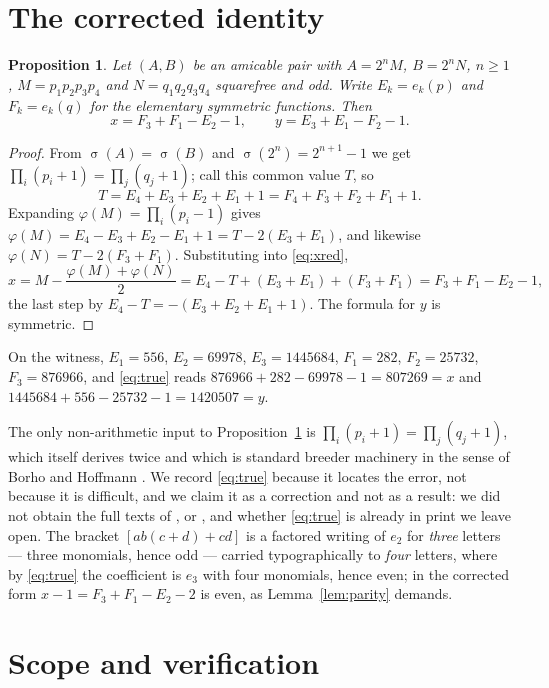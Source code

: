 \documentclass[11pt]{amsart}
\newtheorem{proposition}[theorem]{Proposition}
\theoremstyle{remark}
\DeclareMathOperator{\sig}{\sigma}
\begin{document}
\section{The corrected identity}

\begin{proposition}\label{prop:true}
Let $(A,B)$ be an amicable pair with $A=2^nM$, $B=2^nN$, $n\ge1$,
$M=p_1p_2p_3p_4$ and $N=q_1q_2q_3q_4$ squarefree and odd. Write $E_k=e_k(p)$
and $F_k=e_k(q)$ for the elementary symmetric functions. Then
\begin{equation}\label{eq:true}
 x=F_3+F_1-E_2-1,
 \qquad
 y=E_3+E_1-F_2-1 .
\end{equation}
\end{proposition}

\begin{proof}
From $\sig(A)=\sig(B)$ and $\sig(2^n)=2^{n+1}-1$ we get
$\prod_i(p_i+1)=\prod_j(q_j+1)$; call this common value $T$, so
\[
 T=E_4+E_3+E_2+E_1+1=F_4+F_3+F_2+F_1+1 .
\]
Expanding $\varphi(M)=\prod_i(p_i-1)$ gives
$\varphi(M)=E_4-E_3+E_2-E_1+1=T-2(E_3+E_1)$, and likewise
$\varphi(N)=T-2(F_3+F_1)$. Substituting into \eqref{eq:xred},
\[
 x=M-\frac{\varphi(M)+\varphi(N)}{2}
  =E_4-T+(E_3+E_1)+(F_3+F_1)
  =F_3+F_1-E_2-1 ,
\]
the last step by $E_4-T=-(E_3+E_2+E_1+1)$. The formula for $y$ is symmetric.
\end{proof}

On the witness, $E_1=556$, $E_2=69978$, $E_3=1445684$, $F_1=282$, $F_2=25732$,
$F_3=876966$, and \eqref{eq:true} reads $876966+282-69978-1=807269=x$ and
$1445684+556-25732-1=1420507=y$.

The only non-arithmetic input to Proposition~\ref{prop:true} is
$\prod_i(p_i+1)=\prod_j(q_j+1)$, which \cite{MA} itself derives twice and which
is standard breeder machinery in the sense of Borho and Hoffmann \cite{BH}. We
record \eqref{eq:true} because it locates the error, not because it is
difficult, and we claim it as a correction and not as a result: we did not
obtain the full texts of \cite{BH}, \cite{Costello} or \cite{GPtR}, and whether
\eqref{eq:true} is already in print we leave open. The bracket $[ab(c+d)+cd]$ is
a factored writing of $e_2$ for \emph{three} letters --- three monomials, hence
odd --- carried typographically to \emph{four} letters, where by \eqref{eq:true}
the coefficient is $e_3$ with four monomials, hence even; in the corrected form
$x-1=F_3+F_1-E_2-2$ is even, as Lemma~\ref{lem:parity} demands.

\section{Scope and verification}
\end{document}
